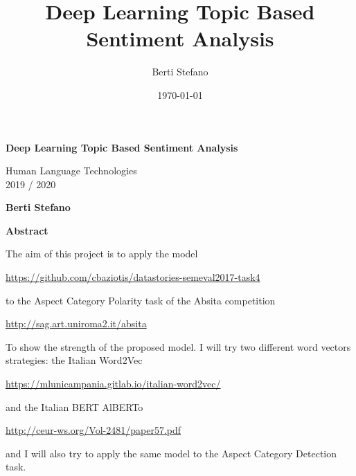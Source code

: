 \documentclass{article}
\title{Deep Learning Topic Based Sentiment Analysis}
\author{Berti Stefano}
\date{\today}
\begin{document}
    \thispagestyle{plain}
    \begin{center}
        \Large
        \textbf{Deep Learning Topic Based Sentiment Analysis}

        \vspace{0.4cm}
        \large Human Language Technologies
        \\2019 / 2020

        \vspace{0.4cm}
        \textbf{Berti Stefano}

        \vspace{0.9cm}
        \textbf{Abstract}
    \end{center}
    The aim of this project is to apply the model
    \\\centerline{\url{https://github.com/cbaziotis/datastories-semeval2017-task4}}
    to the Aspect Category Polarity task of the Absita competition
    \\\centerline{\url{http://sag.art.uniroma2.it/absita}}
    To show the strength of the proposed model.
    I will try two different word vectors strategies: the Italian Word2Vec
    \\\centerline{\url{https://mlunicampania.gitlab.io/italian-word2vec/}}
    and the Italian BERT AlBERTo
    \\\centerline{\url{http://ceur-ws.org/Vol-2481/paper57.pdf}}
    and I will also try to apply the same model to the Aspect Category Detection task.
\end{document}
